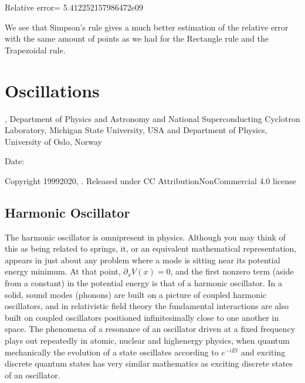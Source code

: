 \documentclass[letterpaper,10pt,english]{sphinxmanual}
\begin{document}
\begin{sphinxVerbatim}[commandchars=\\\{\}]
Relative error=  5.412252157986472e\PYGZhy{}09
\end{sphinxVerbatim}

We see that Simpson’s rule gives a much better estimation of the relative error with the same amount of points as we had for the Rectangle rule and the Trapezoidal rule.




\section{Oscillations}
\label{\detokenize{chapter4:oscillations}}\label{\detokenize{chapter4::doc}}




, Department of Physics and Astronomy and National Superconducting Cyclotron Laboratory, Michigan State University, USA and Department of Physics, University of Oslo, Norway









Date: 

Copyright 1999\sphinxhyphen{}2020, . Released under CC Attribution\sphinxhyphen{}NonCommercial 4.0 license


\subsection{Harmonic Oscillator}
\label{\detokenize{chapter4:harmonic-oscillator}}
The harmonic oscillator is omnipresent in physics. Although you may think
of this as being related to springs, it, or an equivalent
mathematical representation, appears in just about any problem where a
mode is sitting near its potential energy minimum. At that point,
\(\partial_x V(x)=0\), and the first non\sphinxhyphen{}zero term (aside from a
constant) in the potential energy is that of a harmonic oscillator. In
a solid, sound modes (phonons) are built on a picture of coupled
harmonic oscillators, and in relativistic field theory the fundamental
interactions are also built on coupled oscillators positioned
infinitesimally close to one another in space. The phenomena of a
resonance of an oscillator driven at a fixed frequency plays out
repeatedly in atomic, nuclear and high\sphinxhyphen{}energy physics, when quantum
mechanically the evolution of a state oscillates according to
\(e^{-iEt}\) and exciting discrete quantum states has very similar
mathematics as exciting discrete states of an oscillator.
\end{document}
